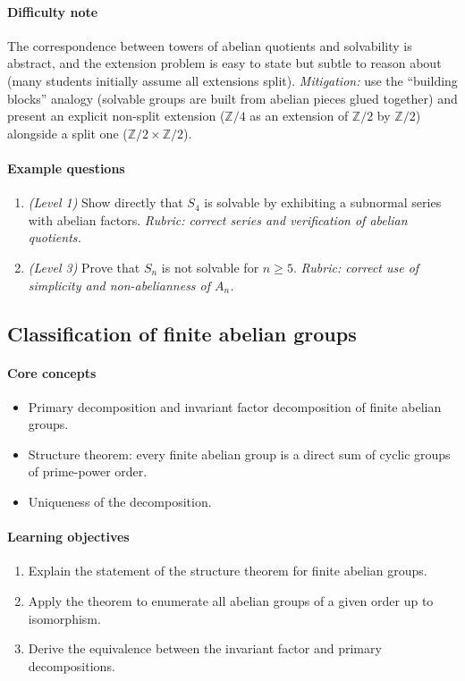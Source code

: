\documentclass{article}
\begin{document}
\paragraph{Difficulty note}
The correspondence between towers of abelian quotients and solvability is abstract, and the extension problem is easy to state but subtle to reason about (many students initially assume all extensions split). \emph{Mitigation:} use the ``building blocks'' analogy (solvable groups are built from abelian pieces glued together) and present an explicit non-split extension ($\mathbb{Z}/4$ as an extension of $\mathbb{Z}/2$ by $\mathbb{Z}/2$) alongside a split one ($\mathbb{Z}/2\times\mathbb{Z}/2$).
\paragraph{Example questions}
\begin{enumerate}[nosep]
  \item \emph{(Level 1)} Show directly that $S_4$ is solvable by exhibiting a subnormal series with abelian factors. \emph{Rubric: correct series and verification of abelian quotients.}
  \item \emph{(Level 3)} Prove that $S_n$ is not solvable for $n \geq 5$. \emph{Rubric: correct use of simplicity and non-abelianness of $A_n$.}
\end{enumerate}

\subsection{Classification of finite abelian groups}
\paragraph{Core concepts}
\begin{itemize}[nosep]
  \item Primary decomposition and invariant factor decomposition of finite abelian groups.
  \item Structure theorem: every finite abelian group is a direct sum of cyclic groups of prime-power order.
  \item Uniqueness of the decomposition.
\end{itemize}
\paragraph{Learning objectives}
\begin{enumerate}[nosep]
  \item Explain the statement of the structure theorem for finite abelian groups.
  \item Apply the theorem to enumerate all abelian groups of a given order up to isomorphism.
  \item Derive the equivalence between the invariant factor and primary decompositions.
\end{enumerate}
\end{document}
